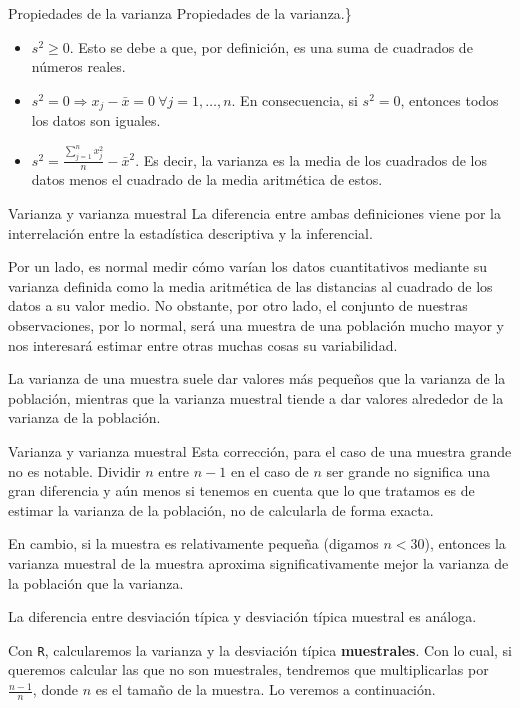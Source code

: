 \documentclass[
  ignorenonframetext,
  aspectratio=169]{beamer}
\providecommand{\tightlist}{%
  \setlength{\itemsep}{0pt}\setlength{\parskip}{0pt}}
\begin{document}
\begin{frame}{Propiedades de la varianza}
\protect\hypertarget{propiedades-de-la-varianza}{}
Propiedades de la varianza.\}

\begin{itemize}
\tightlist
\item
  \(s^2\ge 0\). Esto se debe a que, por definición, es una suma de
  cuadrados de números reales.
\item
  \(s^2 = 0\Longrightarrow x_j-\bar{x}=0\ \forall j= 1,\dots,n\). En
  consecuencia, si \(s^2=0\), entonces todos los datos son iguales.
\item
  \(s^2 =\frac{\sum_{j=1}^nx_j^2}{n}-\bar{x}^2\). Es decir, la varianza
  es la media de los cuadrados de los datos menos el cuadrado de la
  media aritmética de estos.
\end{itemize}
\end{frame}

\begin{frame}{Varianza y varianza muestral}
\protect\hypertarget{varianza-y-varianza-muestral}{}
La diferencia entre ambas definiciones viene por la interrelación entre
la estadística descriptiva y la inferencial.

Por un lado, es normal medir cómo varían los datos cuantitativos
mediante su varianza definida como la media aritmética de las distancias
al cuadrado de los datos a su valor medio. No obstante, por otro lado,
el conjunto de nuestras observaciones, por lo normal, será una muestra
de una población mucho mayor y nos interesará estimar entre otras muchas
cosas su variabilidad.

La varianza de una muestra suele dar valores más pequeños que la
varianza de la población, mientras que la varianza muestral tiende a dar
valores alrededor de la varianza de la población.
\end{frame}

\begin{frame}[fragile]{Varianza y varianza muestral}
\protect\hypertarget{varianza-y-varianza-muestral-1}{}
Esta corrección, para el caso de una muestra grande no es notable.
Dividir \(n\) entre \(n-1\) en el caso de \(n\) ser grande no significa
una gran diferencia y aún menos si tenemos en cuenta que lo que tratamos
es de estimar la varianza de la población, no de calcularla de forma
exacta.

En cambio, si la muestra es relativamente pequeña (digamos \(n<30\)),
entonces la varianza muestral de la muestra aproxima significativamente
mejor la varianza de la población que la varianza.

La diferencia entre desviación típica y desviación típica muestral es
análoga.

Con \texttt{R}, calcularemos la varianza y la desviación típica
\textbf{muestrales}. Con lo cual, si queremos calcular las que no son
muestrales, tendremos que multiplicarlas por \(\frac{n-1}{n}\), donde
\(n\) es el tamaño de la muestra. Lo veremos a continuación.
\end{frame}
\end{document}
